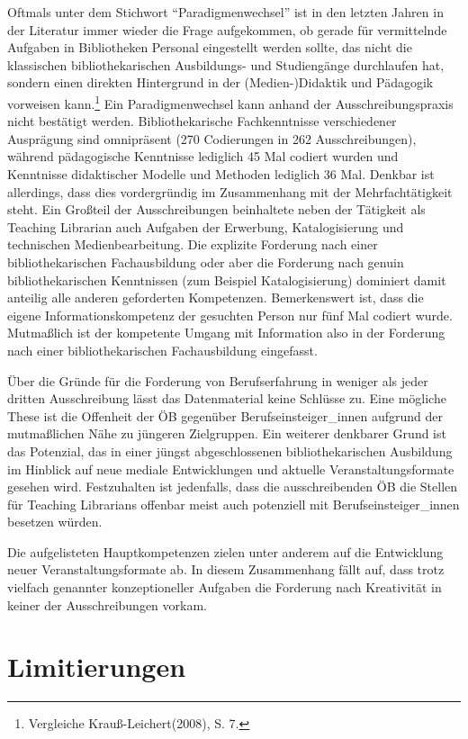 \documentclass[a4paper,
fontsize=11pt,
oneside,
numbers=noperiodatend,
parskip=half-,
bibliography=totoc,
final
]{scrartcl}
\begin{document}
Oftmals unter dem Stichwort \enquote{Paradigmenwechsel} ist in den
letzten Jahren in der Literatur immer wieder die Frage aufgekommen, ob
gerade für vermittelnde Aufgaben in Bibliotheken Personal eingestellt
werden sollte, das nicht die klassischen bibliothekarischen Ausbildungs-
und Studiengänge durchlaufen hat, sondern einen direkten Hintergrund in
der (Medien-)Didaktik und Pädagogik vorweisen kann.\footnote{Vergleiche
  Krauß-Leichert(2008), S. 7.} Ein Paradigmenwechsel kann anhand der
Ausschreibungspraxis nicht bestätigt werden. Bibliothekarische
Fachkenntnisse verschiedener Ausprägung sind omnipräsent (270
Codierungen in 262 Ausschreibungen), während pädagogische Kenntnisse
lediglich 45 Mal codiert wurden und Kenntnisse didaktischer Modelle und
Methoden lediglich 36 Mal. Denkbar ist allerdings, dass dies
vordergründig im Zusammenhang mit der Mehrfachtätigkeit steht. Ein
Großteil der Ausschreibungen beinhaltete neben der Tätigkeit als
Teaching Librarian auch Aufgaben der Erwerbung, Katalogisierung und
technischen Medienbearbeitung. Die explizite Forderung nach einer
bibliothekarischen Fachausbildung oder aber die Forderung nach genuin
bibliothekarischen Kenntnissen (zum Beispiel Katalogisierung) dominiert
damit anteilig alle anderen geforderten Kompetenzen. Bemerkenswert ist,
dass die eigene Informationskompetenz der gesuchten Person nur fünf Mal
codiert wurde. Mutmaßlich ist der kompetente Umgang mit Information also
in der Forderung nach einer bibliothekarischen Fachausbildung
eingefasst.

Über die Gründe für die Forderung von Berufserfahrung in weniger als
jeder dritten Ausschreibung lässt das Datenmaterial keine Schlüsse zu.
Eine mögliche These ist die Offenheit der ÖB gegenüber
Berufseinsteiger\_innen aufgrund der mutmaßlichen Nähe zu jüngeren
Zielgruppen. Ein weiterer denkbarer Grund ist das Potenzial, das in
einer jüngst abgeschlossenen bibliothekarischen Ausbildung im Hinblick
auf neue mediale Entwicklungen und aktuelle Veranstaltungsformate
gesehen wird. Festzuhalten ist jedenfalls, dass die ausschreibenden ÖB
die Stellen für Teaching Librarians offenbar meist auch potenziell mit
Berufseinsteiger\_innen besetzen würden.

Die aufgelisteten Hauptkompetenzen zielen unter anderem auf die
Entwicklung neuer Veranstaltungsformate ab. In diesem Zusammenhang fällt
auf, dass trotz vielfach genannter konzeptioneller Aufgaben die
Forderung nach Kreativität in keiner der Ausschreibungen vorkam.

\hypertarget{limitierungen}{%
\section{Limitierungen}\label{limitierungen}}
\end{document}
